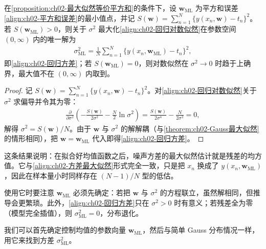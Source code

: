 \documentclass[../../main.tex]{subfiles}
\begin{document}
\begin{proposition}[噪声方差的最大似然解]\label{proposition:ch02-回归方差}
在\cref{proposition:ch02-最大似然等价平方和}的条件下，设 $\mathbf{w}_{\mathrm{ML}}$ 为平方和误差\eqref{align:ch02-平方和误差}的最小值点，并记 $S(\mathbf{w})=\sum_{n=1}^{N}\{y(x_n,\mathbf{w})-t_n\}^{2}$。若 $S(\mathbf{w}_{\mathrm{ML}})>0$，则关于 $\sigma^{2}$ 最大化\eqref{align:ch02-回归对数似然}在参数空间 $(0,\infty)$ 内的唯一解为
\begin{align*}
  \sigma_{\mathrm{ML}}^{2}=\frac{1}{N}\sum_{n=1}^{N}\big\{y(x_n,\mathbf{w}_{\mathrm{ML}})-t_n\big\}^{2},
\end{align*}
即\eqref{align:ch02-回归方差}；若 $S(\mathbf{w}_{\mathrm{ML}})=0$，则对数似然在 $\sigma^{2}\to0$ 时趋于上确界，最大值不在 $(0,\infty)$ 内取到。
\end{proposition}

\begin{proof}
记 $S(\mathbf{w})=\sum_{n=1}^{N}\{y(x_n,\mathbf{w})-t_n\}^{2}$。对\eqref{align:ch02-回归对数似然}关于 $\sigma^{2}$ 求偏导并令其为零：
\begin{align*}
 \frac{\partial}{\partial\sigma^{2}}\left(-\frac{S(\mathbf{w})}{2\sigma^{2}}-\frac{N}{2}\ln\sigma^{2}\right)
 = \frac{S(\mathbf{w})}{2\sigma^{4}} - \frac{N}{2\sigma^{2}} = 0 ,
\end{align*}
解得 $\sigma^{2}=S(\mathbf{w})/N$。由于 $\mathbf{w}$ 与 $\sigma^{2}$ 的解解耦（与\cref{theorem:ch02-Gauss最大似然}的情形相同），把 $\mathbf{w}=\mathbf{w}_{\mathrm{ML}}$ 代入即得\eqref{align:ch02-回归方差}。
\end{proof}

\begin{remark}
这条结果说明：在拟合好均值函数之后，噪声方差的最大似然估计就是残差的均方值。它与\eqref{align:ch02-方差最大似然}形式完全一致，只是把 $x_n$ 换成了 $y(x_n,\mathbf{w}_{\mathrm{ML}})$，因此在样本量小时同样存在 $(N-1)/N$ 型的低估。

使用它时要注意 $\mathbf{w}_{\mathrm{ML}}$ 必须先确定：若把 $\mathbf{w}$ 与 $\sigma^{2}$ 的方程联立，虽然解相同，但推导会更繁琐。此外，\eqref{align:ch02-回归方差}只在 $\sigma^{2}>0$ 时有意义；若残差全为零（模型完全插值），则 $\sigma_{\mathrm{ML}}^{2}=0$，分布退化。
\end{remark}

我们可以首先确定控制均值的参数向量 $\mathbf{w}_{\mathrm{ML}}$，然后与简单 Gauss 分布情况一样，用它来找到方差 $\sigma_{\mathrm{ML}}^{2}$。
\end{document}

